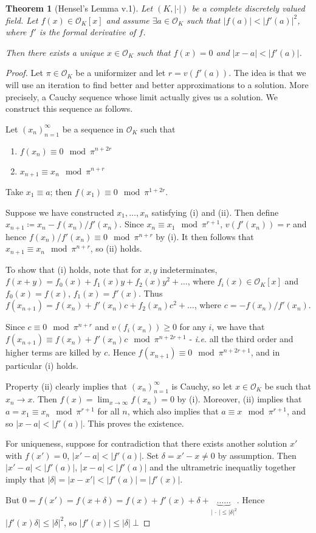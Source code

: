 \documentclass[]{article}
\theoremstyle{custhm}
\newtheorem{theorem}{Theorem}[section]
\theoremstyle{cusdef}
\theoremstyle{custhm}
\theoremstyle{custhm}
\theoremstyle{custhm}
\theoremstyle{custhm}
\theoremstyle{cusdef}
\theoremstyle{remark}
\newcommand{\ra}{\rightarrow}
\renewcommand{\it}[1]{\textit{#1}}
\newcommand{\valk}{(K,|\cdot|)}
\renewcommand{\O}{\mathcal{O}}
\begin{document}
\begin{theorem}[Hensel's Lemma v.1]
Let $\valk$ be a complete discretely valued field. Let $f(x)\in \O_K[x]$ and assume $\exists a\in \O_K$ such that $|f(a)| < |f'(a)|^2$, where $f'$ is the formal derivative of $f$.

Then there exists a unique $x\in \O_K$ such that $f(x) = 0$ and $|x-a| < |f'(a)|$.
\end{theorem}
\begin{proof}
Let $\pi\in \O_K$ be a uniformizer and let $r = v(f'(a))$. The idea is that we will use an iteration to find better and better approximations to a solution. More precisely, a Cauchy sequence whose limit actually gives us a solution. We construct this sequence as follows.

Let $(x_n)_{n=1}^{\infty}$ be a sequence in $\O_K$ such that
\begin{enumerate}[label=(\roman*)]
	\item $f(x_n)\equiv 0\mod \pi^{n+2r}$
	\item $x_{n+1}\equiv x_n \mod \pi^{n+r}$
\end{enumerate}

Take $x_1 \equiv a$; then $f(x_1)\equiv 0 \mod \pi^{1+2r}$.

Suppose we have constructed $x_1,\dots,x_n$ satisfying (i) and (ii). Then define $x_{n+1}\coloneqq x_n - f(x_n)/f'(x_n)$. Since $x_n \equiv x_1 \mod \pi^{r+1}$, $v(f'(x_n)) = r$ and hence $f(x_n)/f'(x_n) \equiv 0\mod \pi^{n+r}$ by (i). It then follows that $x_{n+1}\equiv x_n \mod \pi^{n+r}$, so (ii) holds.

To show that (i) holds, note that for $x,y$ indeterminates, $f(x+y) = f_0(x) + f_1(x)y + f_2(x)y^2+\dots$, where $f_i(x)\in \O_K[x]$ and $f_0(x) = f(x)$, $f_1(x) = f'(x)$. Thus $f(x_{n+1}) = f(x_n) + f'(x_n)c + f_2(x_n)c^2+\dots$, where $c = -f(x_n)/f'(x_n)$.

Since $c \equiv 0 \mod \pi^{n+r}$ and $v(f_i(x_n)) \ge 0$ for any $i$, we have that $f(x_{n+1}) \equiv f(x_n) + f'(x_n)c \mod \pi^{n+2r+1}$ - \it{i.e.} all the third order and higher terms are killed by $c$. Hence $f(x_{n+1}) \equiv 0 \mod \pi^{n+2r+1}$, and in particular (i) holds.

Property (ii) clearly implies that $(x_n)_{n=1}^{\infty}$ is Cauchy, so let $x\in \O_K$ be such that $x_n\ra x$. Then $f(x) = \lim_{x\ra\infty}f(x_n) = 0$ by (i). Moreover, (ii) implies that $a = x_1 \equiv x_n \mod \pi^{r+1}$ for all $n$, which also implies that $a\equiv x\mod \pi^{r+1}$, and so $|x-a| < |f'(a)|$. This proves the existence.

For uniqueness, suppose for contradiction that there exists another solution $x'$ with $f(x') = 0$, $|x'-a| < |f'(a)|$. Set $\delta = x' - x\neq 0$ by assumption. Then $|x'-a| < |f'(a)|$, $|x-a|<|f'(a)|$ and the ultrametric inequatliy together imply that $|\delta| = |x - x'| < |f'(a)| = |f'(x)|$.

But $0 = f(x') = f(x+\delta) = f(x) + f'(x) + \delta + \underbrace{\dots\dots}_{|\ \cdot\ |\le |\delta|^2}$. Hence $|f'(x)\delta| \le |\delta|^2$, so $|f'(x)| \le |\delta|\ \bot$
\end{proof}
\end{document}
